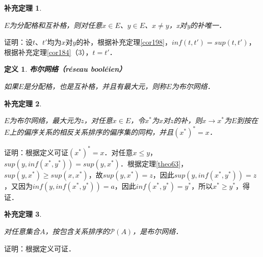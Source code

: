 \documentclass[12pt, a4paper, oneside]{book}
\newtheorem{cor}{补充定理}
\newtheorem{de}{定义}
\begin{document}
			\begin{cor}\label{cor200}
				\hfill\par
				$E$为分配格和互补格，则对任意$x\in E$、$y\in E$、$x\neq y$，x对y的补唯一．
			\end{cor}
			证明：设$t$、$t'$均为$x$对$y$的补，根据补充定理\ref{cor198}，$inf(t, t')=sup(t, t')$，根据补充定理\ref{cor184}（3），$t=t'$．

			\begin{de}
				\textbf{布尔网络（réseau booléien）}
				\par
				如果$E$是分配格，也是互补格，并且有最大元，则称$E$为布尔网络．				
			\end{de}

			\begin{cor}\label{cor201}
				\hfill\par
				$E$为布尔网络，最大元为$z$，对任意$x\in E$，令$x^*$为$x$对$z$的补，则$x\to x^*$为$E$到按在$E$上的偏序关系的相反关系排序的偏序集的同构，并且$(x^*)^*=x$．
			\end{cor}
			证明：根据定义可证$(x^*)^*=x$．对任意$x\leq y$，$sup(y, inf(x^*, y^*))=sup(y, x^*)$．根据定理\ref{theo63}，$sup(y, x^*)\geq sup(x, x^*)$，故$sup(y, x^*)=z$，因此$sup(y, inf(x^*, y^*))=z$，又因为$inf(y, inf(x^*, y^*))=a$，因此$inf(x^*, y^*)=y^*$，所以$x^*\geq y^*$，得证．
									
			\begin{cor}\label{cor202}
				\hfill\par
				对任意集合$A$，按包含关系排序的$\mathcal{P}(A)$，是布尔网络．
			\end{cor}
			证明：根据定义可证．
			
\end{document}

